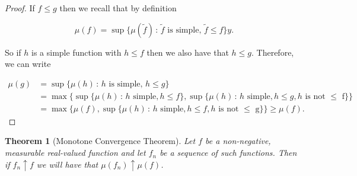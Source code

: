 \documentclass[
]{book}
\newtheorem{theorem}{Theorem}[chapter]
\theoremstyle{definition}
\theoremstyle{definition}
\theoremstyle{definition}
\theoremstyle{definition}
\theoremstyle{remark}
\begin{document}
\begin{proof}
If \(f \leq g\) then we recall that by definition

\[\mu(f) = \sup\{ \mu(\tilde{f}) \,:\, \mbox{$\tilde{f}$ is simple},\, \tilde{f} \leq f\}y.\]

So if \(h\) is a simple function with \(h \leq f\) then we also have that \(h \leq g\). Therefore, we can write

\begin{align*} \mu(g) &= \sup\{ \mu(h) \,:\, \mbox{$h$ is simple},\, h \leq g\} \\ &= \max\{\sup\{ \mu(h)\, :\, \mbox{$h$ simple}, h \leq f\}, \sup\{ \mu(h)\, :\, \mbox{$h$ simple}, h \leq g, \mbox{$h$ is not $\leq$ f}\} \}\\ &= \max\{ \mu(f), \sup\{ \mu(h)\, :\, \mbox{$h$ simple}, h \leq f, \mbox{$h$ is not $\leq$ g}\}\} \geq \mu(f).\end{align*}
\end{proof}

\begin{theorem}[Monotone Convergence Theorem]
Let \(f\) be a non-negative, measurable real-valued function and let \(f_n\) be a sequence of such functions. Then if \(f_n \uparrow f\) we will have that \(\mu(f_n) \uparrow \mu(f)\).
\end{theorem}
\end{document}
